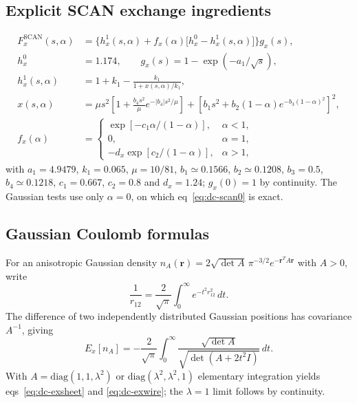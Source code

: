 \documentclass[journal=jctcce,manuscript=article]{achemso}
\begin{document}
\subsection{Explicit SCAN exchange ingredients}
\begin{align}
F_x^{\mathrm{SCAN}}(s,\alpha)&=\bigl\{h_x^1(s,\alpha)+f_x(\alpha)\bigl[h_x^0-h_x^1(s,\alpha)\bigr]\bigr\}g_x(s),
\label{eq:dc-scanfull}\\
h_x^0&=1.174,\qquad g_x(s)=1-\exp(-a_1/\sqrt s),
\label{eq:dc-h0}\\
h_x^1(s,\alpha)&=1+k_1-\frac{k_1}{1+x(s,\alpha)/k_1},
\label{eq:dc-h1}\\
x(s,\alpha)&=\mu s^2\left[1+\frac{b_4s^2}{\mu}e^{-|b_4|s^2/\mu}\right]
+\left[b_1s^2+b_2(1-\alpha)e^{-b_3(1-\alpha)^2}\right]^2,
\label{eq:dc-x}\\
f_x(\alpha)&=\begin{cases}
\exp[-c_1\alpha/(1-\alpha)], & \alpha<1,\\
0, & \alpha=1,\\
-d_x\exp[c_2/(1-\alpha)], & \alpha>1,
\end{cases}
\label{eq:dc-fx}
\end{align}
with $a_1=4.9479$, $k_1=0.065$, $\mu=10/81$, $b_1\simeq0.1566$,
$b_2\simeq0.1208$, $b_3=0.5$, $b_4\simeq0.1218$, $c_1=0.667$, $c_2=0.8$ and
$d_x=1.24$; $g_x(0)=1$ by continuity.  The Gaussian tests use only
$\alpha=0$, on which eq~\ref{eq:dc-scan0} is exact.

\subsection{Gaussian Coulomb formulas}
\label{app:coulomb}
For an anisotropic Gaussian density
$n_A(\mathbf r)=2\sqrt{\det A}\,\pi^{-3/2}e^{-\mathbf r^TA\mathbf r}$ with $A>0$,
write
\begin{equation}
\frac{1}{r_{12}}=\frac{2}{\sqrt\pi}\int_0^\infty e^{-t^2r_{12}^2}\,dt.
\label{eq:dc-gausstrans}
\end{equation}
The difference of two independently distributed Gaussian positions has
covariance $A^{-1}$, giving
\begin{equation}
E_x[n_A]=-\frac{2}{\sqrt\pi}\int_0^\infty
\frac{\sqrt{\det A}}{\sqrt{\det(A+2t^2I)}}\,dt.
\label{eq:dc-ex44}
\end{equation}
With $A=\mathrm{diag}(1,1,\lambda^2)$ or $\mathrm{diag}(\lambda^2,\lambda^2,1)$
elementary integration yields eqs~\ref{eq:dc-exsheet} and \ref{eq:dc-exwire};
the $\lambda=1$ limit follows by continuity.
\end{document}

